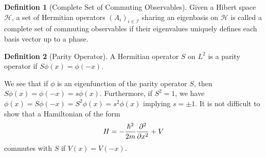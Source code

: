 \documentclass[]{article}
\theoremstyle{definition}
\theoremstyle{definition}
\newtheorem{definition}{Definition}[section]
\begin{document}
\begin{definition}[Complete Set of Commuting Observables]
  Given a Hibert space \(\mathcal{H}\), a set of Hermitian operators 
  \((A_i)_{i \in \mathcal{I}}\) sharing an eigenbasis on \(\mathcal{H}\) 
  is called a complete set of commuting observables if their eigenvalues 
  uniquely defines each basis vector up to a phase.
\end{definition}

\begin{definition}[Parity Operator]
  A Hermitian operator \(S\) on \(L^2\) is a parity operator if 
  \(S\phi(x) = \phi(-x)\).
\end{definition}

We see that if \(\phi\) is an eigenfunction of the parity operator \(S\), then 
\(S \phi(x) = \phi(-x) = s\phi(x)\). Furthermore, if \(S^2 = 1\), we have 
\(\phi(x) = S\phi(-x) = S^2 \phi(x) = s^2 \phi(x)\) implying \(s = \pm 1\).
It is not difficult to show that a Hamiltonian of the form 
\[H = - \frac{\hbar^2}{2m} \pdv[2]{x} + V\]
commutes with \(S\) if \(V(x) = V(-x)\).
\end{document}
